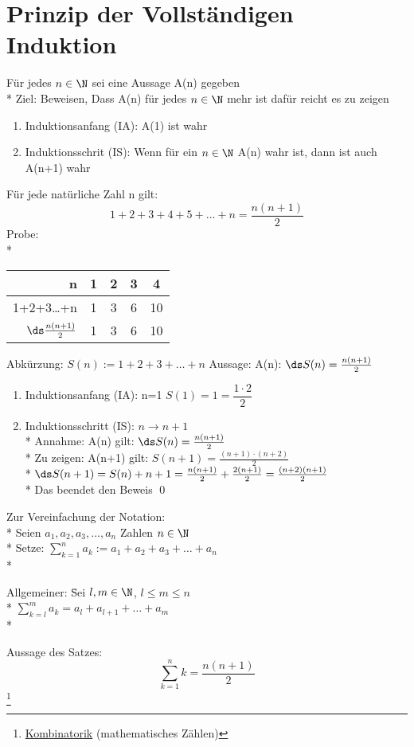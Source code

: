 \section{Prinzip der Vollständigen Induktion}
Für jedes $n \in \N$ sei eine Aussage A(n) gegeben\\*
Ziel: Beweisen, Dass A(n) für jedes $n \in \N$ mehr ist dafür reicht es zu zeigen
\begin{enumerate}
\item{Induktionsanfang (IA): A(1) ist wahr}
\item{Induktionsschrit (IS): Wenn für ein $n \in \N$ A(n) wahr ist, dann ist auch A(n+1) wahr}
\end{enumerate}
%
Für jede natürliche Zahl n gilt:
$$1+2+3+4+5+…+n=\frac{n(n+1)}{2}$$
Probe:\\*
\begin{tabular}{r|c|c|c|c}
n & 1 & 2 & 3 & 4\\* \hline\hline
1+2+3…+n & 1 & 3 & 6 & 10\\* \hline
$\ds \frac{n(n+1)}{2}$ & 1 & 3 & 6 & 10\\*
\end{tabular}
Abkürzung: $S(n) := 1+2+3+…+n$
Aussage: A(n): $\ds S(n) = \frac{n(n+1)}{2}$
\begin{enumerate}
\item {Induktionsanfang (IA): n=1 $S(1) = 1 = \dfrac{1·2}{2}$}
\item {Induktionsschritt (IS): $n → n+1$\\*
Annahme: A(n) gilt: $\ds S(n) = \frac{n(n+1)}{2}$\\*
Zu zeigen: A(n+1) gilt: $S(n+1)=\frac{(n+1)·(n+2)}{2}$\\*
$\ds S(n+1)=S(n)+n+1=\frac{n(n+1)}{2}+\frac{2(n+1)}{2}=\frac{(n+2)(n+1)}{2}$\\*
Das beendet den Beweis} \qed
\end{enumerate}
Zur Vereinfachung der Notation:\\*
Seien $a_1,a_2,a_3,…,a_n$ Zahlen $n \in \N$\\*
Setze: $\sum_{k=1}^n a_k := a_1+a_2+a_3+…+a_n$\\*
\begin{tabbing}
Allgemeiner: \=Sei $l,m \in \N$, $l \le m \le n$\\*
\>$\sum_{k=l}^m a_k = a_l+a_{l+1}+…+a_m$\\*
\end{tabbing}
Aussage des Satzes:
\[ \sum_{k=1}^n k = \frac{n(n+1)}{2}\]\footnote{\ul{Kombinatorik} (mathematisches Zählen)}

